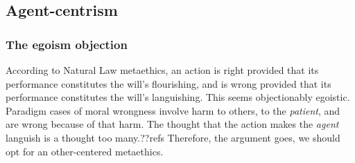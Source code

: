 


\subsection{Agent-centrism}
\subsubsection{The egoism objection}
According to Natural Law metaethics, an action is right provided that its performance constitutes the will's flourishing,
and is wrong provided that its performance constitutes the will's languishing. This seems objectionably egoistic. Paradigm
cases of moral wrongness involve harm to others, to the \textit{patient}, and are wrong because of that harm. The thought that the action makes the 
\textit{agent} languish is a thought too many.??refs Therefore, the argument goes, we should opt for an other-centered metaethics.

